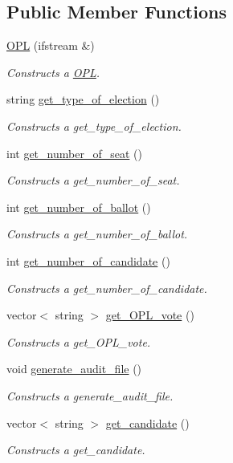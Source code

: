\subsection*{Public Member Functions}
\begin{DoxyCompactItemize}
\item 
\hyperlink{classOPL_a5784a8f6afe69d2ed05473e1517b4b89}{O\+PL} (ifstream \&)
\begin{DoxyCompactList}\small\item\em Constructs a \hyperlink{classOPL}{O\+PL}. \end{DoxyCompactList}\item 
string \hyperlink{classOPL_a3c3ffffffe20b1f68d45c6d9771229ba}{get\+\_\+type\+\_\+of\+\_\+election} ()
\begin{DoxyCompactList}\small\item\em Constructs a get\+\_\+type\+\_\+of\+\_\+election. \end{DoxyCompactList}\item 
int \hyperlink{classOPL_a33a05c88d7819a6f5f51d60a5801e63c}{get\+\_\+number\+\_\+of\+\_\+seat} ()
\begin{DoxyCompactList}\small\item\em Constructs a get\+\_\+number\+\_\+of\+\_\+seat. \end{DoxyCompactList}\item 
int \hyperlink{classOPL_a9409c14dcdc6fd849ff223b2fc71e913}{get\+\_\+number\+\_\+of\+\_\+ballot} ()
\begin{DoxyCompactList}\small\item\em Constructs a get\+\_\+number\+\_\+of\+\_\+ballot. \end{DoxyCompactList}\item 
int \hyperlink{classOPL_ac8c59d0f260a307c105fe7a603c608c1}{get\+\_\+number\+\_\+of\+\_\+candidate} ()
\begin{DoxyCompactList}\small\item\em Constructs a get\+\_\+number\+\_\+of\+\_\+candidate. \end{DoxyCompactList}\item 
vector$<$ string $>$ \hyperlink{classOPL_a5eaebfc6fd65265f4cffe9acca031c85}{get\+\_\+\+O\+P\+L\+\_\+vote} ()
\begin{DoxyCompactList}\small\item\em Constructs a get\+\_\+\+O\+P\+L\+\_\+vote. \end{DoxyCompactList}\item 
void \hyperlink{classOPL_a722c21c660660dc97da0c4e07f6fd4e1}{generate\+\_\+audit\+\_\+file} ()
\begin{DoxyCompactList}\small\item\em Constructs a generate\+\_\+audit\+\_\+file. \end{DoxyCompactList}\item 
vector$<$ string $>$ \hyperlink{classOPL_aa6f8d3ce7697842d956d9e6b95866dcf}{get\+\_\+candidate} ()
\begin{DoxyCompactList}\small\item\em Constructs a get\+\_\+candidate. \end{DoxyCompactList}\end{DoxyCompactItemize}


